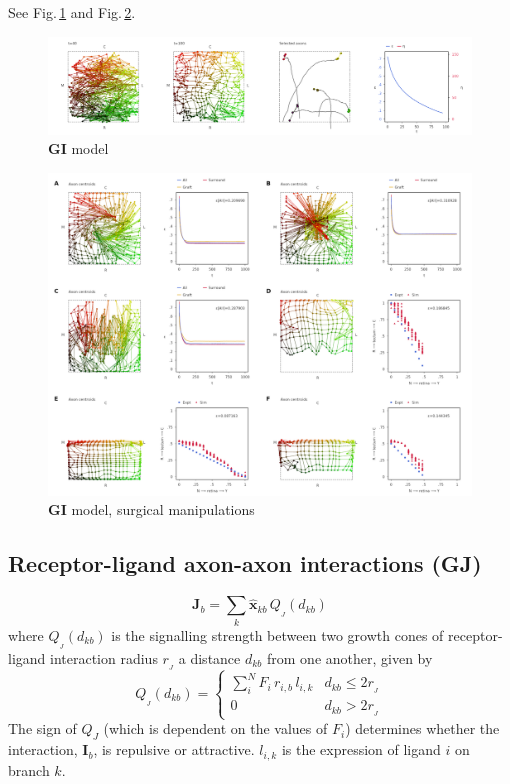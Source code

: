 \documentclass[11pt, a4paper]{article}
\begin{document}
See Fig.\,\ref{f:GI} and Fig.\,\ref{f:GIsurg}.

\begin{figure}
\includegraphics[width=\linewidth]{./images/j4_ee_GI_best_1_wt_figcomp2.png}
\caption{$\mathbf{GI}$ model}
\label{f:GI}
\end{figure}

\begin{figure}
\includegraphics[width=\linewidth]{./images/fig_GI_surgical.png}
\caption{$\mathbf{GI}$ model, surgical manipulations}
\label{f:GIsurg}
\end{figure}

\subsection*{Receptor-ligand axon-axon interactions (GJ)}

%
\begin{equation}
\mathbf{J}_b = \sum_k \hat{\mathbf{x}}_{kb}\,Q_{\!_J}(d_{kb})
\end{equation}
%
where $Q_{\!_J}(d_{kb})$ is the signalling strength between two growth cones of
receptor-ligand interaction radius $r_{\!_J}$ a distance $d_{kb}$ from one another,
given by
%
\begin{equation}
Q_{\!_J}(d_{kb}) = \begin{cases}
     \sum_i^N F_i\,r_{i,b}\,l_{i,k}    & d_{kb} \leq 2r_{\!_J} \\
     0 & d_{kb} > 2r_{\!_J}
     \end{cases}
\end{equation}
%
The sign of $Q_J$ (which is dependent on the values of $F_i$) determines whether
the interaction, $\mathbf{I}_b$, is repulsive or attractive. $l_{i,k}$ is the
expression of ligand $i$ on branch $k$.
\end{document}
